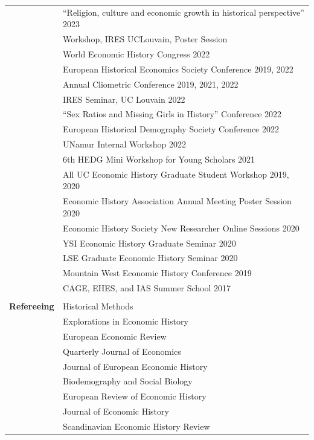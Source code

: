 \documentclass[a4paper,11pt,oneside]{article}
\begin{document}
\begin{longtable}{@{} p{0.175\linewidth} p{0.775\linewidth} p{0.05\linewidth}}
   & \multicolumn{2}{l}{``Religion, culture and economic growth in historical perspective''  \hfill 2023} \\ 
   & \hspace{4ex} Workshop, IRES UCLouvain, Poster Session \\
   & \multicolumn{2}{l}{World Economic History Congress  \hfill 2022} \\
   & \multicolumn{2}{l}{  European Historical Economics Society Conference   \hfill 2019, 2022} \\
   & \multicolumn{2}{l}{ Annual Cliometric Conference    \hfill 2019, 2021, 2022} \\
   & \multicolumn{2}{l}{IRES Seminar, UC Louvain \hfill 2022 }\\
   &  \multicolumn{2}{l}{``Sex Ratios and Missing Girls in History'' Conference \hfill 2022}\\
   & \multicolumn{2}{l}{European Historical Demography Society Conference \hfill 2022 }\\
   & \multicolumn{2}{l}{UNamur Internal Workshop \hfill 2022 }\\
   &  \multicolumn{2}{l}{ 6th HEDG Mini Workshop for Young Scholars   \hfill 2021}\\
   & \multicolumn{2}{l}{ All UC Economic History Graduate Student Workshop  \hfill 2019, 2020}\\
   & \multicolumn{2}{l}{ Economic History Association Annual Meeting Poster Session \hfill  2020}\\
   &\multicolumn{2}{l}{  Economic History Society New Researcher Online Sessions \hfill 2020}\\
   &  \multicolumn{2}{l}{YSI Economic History Graduate Seminar \hfill 2020}\\
   &  \multicolumn{2}{l}{LSE Graduate Economic History Seminar \hfill  2020}\\
   & \multicolumn{2}{l}{ Mountain West Economic History Conference  \hfill  2019}\\
   &  \multicolumn{2}{l}{CAGE, EHES, and IAS Summer School  \hfill  2017}\\
   \\
   \textbf{\large{Refereeing}} 
  & Historical Methods  &\\
  & Explorations in Economic History     &\\
  & European Economic Review    &\\
   & Quarterly Journal of Economics &\\
   & Journal of European Economic History &\\
   & Biodemography and Social Biology & \\
   &  European Review of Economic History &\\
    & Journal of Economic History & \\
    & Scandinavian Economic History Review  & \\
 
\end{longtable}
\end{document}
